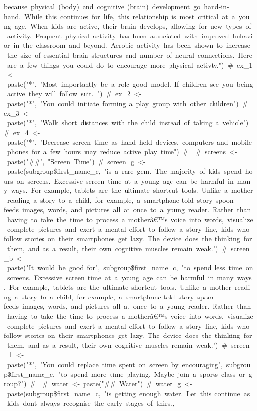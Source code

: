\documentclass[]{article}
\newcommand{\euro}{€}
\begin{document}
because\ physical\ (body)\ and\ cognitive\ (brain)\ development\ go\ hand-in-hand.\ While\ this\ continues\ for\ life,\ this\ relationship\ is\ most\ critical\ at\ a\ young\ age.\ When\ kids\ are\ active,\ their\ brain\ develops,\ allowing\ for\ new\ types\ of\ activity.\ Frequent\ physical\ activity\ has\ been\ associated\ with\ improved\ behavior\ in\ the\ classroom\ and\ beyond.\ Aerobic\ activity\ has\ been\ shown\ to\ increase\ the\ size\ of\ essential\ brain\ structures\ and\ number\ of\ neural\ connections.\ Here\ are\ a\ few\ things\ you\ could\ do\ to\ encourage\ more\ physical\ activty.")\ \#\ ex\_1\ \textless{}-\ paste("*",\ "Most\ importantly\ be\ a\ role\ good\ model.\ If\ children\ see\ you\ being\ active\ they\ will\ follow\ suit.\ ")\ \#\ ex\_2\ \textless{}-\ paste("*",\ "You\ could\ initiate\ forming\ a\ play\ group\ with\ other\ children")\ \#\ ex\_3\ \textless{}-\ paste("*",\ "Walk\ short\ distances\ with\ the\ child\ instead\ of\ taking\ a\ vehicle")\ \#\ ex\_4\ \textless{}-\ paste("*",\ "Decrease\ screen\ time\ as\ hand\ held\ devices,\ computers\ and\ mobile\ phones\ for\ a\ few\ hours\ may\ reduce\ active\ play\ time")\ \#\ \ \#\ screens\ \textless{}-\ paste("\#\#",\ "Screen\ Time")\ \#\ screen\_g\ \textless{}-\ paste(subgroup\$first\_name\_c,\ "is\ a\ rare\ gem.\ The\ majority\ of\ kids\ spend\ hours\ on\ screens.\ Excessive\ screen\ time\ at\ a\ young\ age\ can\ be\ harmful\ in\ many\ ways.\ For\ example,\ tablets\ are\ the\ ultimate\ shortcut\ tools.\ Unlike\ a\ mother\ reading\ a\ story\ to\ a\ child,\ for\ example,\ a\ smartphone-told\ story\ spoon-feeds\ images,\ words,\ and\ pictures\ all\ at\ once\ to\ a\ young\ reader.\ Rather\ than\ having\ to\ take\ the\ time\ to\ process\ a\ motherâ\euro{}™s\ voice\ into\ words,\ visualize\ complete\ pictures\ and\ exert\ a\ mental\ effort\ to\ follow\ a\ story\ line,\ kids\ who\ follow\ stories\ on\ their\ smartphones\ get\ lazy.\ The\ device\ does\ the\ thinking\ for\ them,\ and\ as\ a\ result,\ their\ own\ cognitive\ muscles\ remain\ weak.")\ \#\ screen\_b\ \textless{}-\ paste("It\ would\ be\ good\ for",\ subgroup\$first\_name\_c,\ "to\ spend\ less\ time\ on\ screens.\ Excessive\ screen\ time\ at\ a\ young\ age\ can\ be\ harmful\ in\ many\ ways.\ For\ example,\ tablets\ are\ the\ ultimate\ shortcut\ tools.\ Unlike\ a\ mother\ reading\ a\ story\ to\ a\ child,\ for\ example,\ a\ smartphone-told\ story\ spoon-feeds\ images,\ words,\ and\ pictures\ all\ at\ once\ to\ a\ young\ reader.\ Rather\ than\ having\ to\ take\ the\ time\ to\ process\ a\ motherâ\euro{}™s\ voice\ into\ words,\ visualize\ complete\ pictures\ and\ exert\ a\ mental\ effort\ to\ follow\ a\ story\ line,\ kids\ who\ follow\ stories\ on\ their\ smartphones\ get\ lazy.\ The\ device\ does\ the\ thinking\ for\ them,\ and\ as\ a\ result,\ their\ own\ cognitive\ muscles\ remain\ weak.")\ \#\ screen\_1\ \textless{}-\ paste("*",\ "You\ could\ replace\ time\ spent\ on\ screen\ by\ encouraging",\ subgroup\$first\_name\_c,\ "to\ spend\ more\ time\ playing.\ Maybe\ join\ a\ sports\ class\ or\ group?")\ \#\ \ \#\ water\ \textless{}-\ paste("\#\#\ Water")\ \#\ water\_g\ \textless{}-\ paste(subgroup\$first\_name\_c,\ "is\ getting\ enough\ water.\ Let\ this\ continue\ as\ kids\ don\textquotesingle{}t\ always\ recognise\ the\ early\ stages\ of\ thirst,\ 
\end{document}
